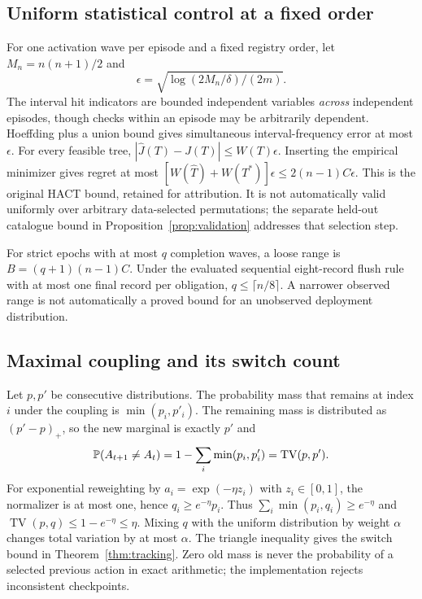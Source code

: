 \subsection{Uniform statistical control at a fixed order}
For one activation wave per episode and a fixed registry order, let $M_n=n(n+1)/2$ and
\[
 \epsilon=\sqrt{\log(2M_n/\delta)/(2m)}.
\]
The interval hit indicators are bounded independent variables \emph{across} independent episodes, though checks within an episode may be arbitrarily dependent. Hoeffding plus a union bound gives simultaneous interval-frequency error at most $\epsilon$. For every feasible tree, $|\widehat J(T)-J(T)|\le W(T)\epsilon$. Inserting the empirical minimizer gives regret at most $[W(\widehat T)+W(T^*)]\epsilon\le2(n-1)C\epsilon$. This is the original HACT bound, retained for attribution. It is not automatically valid uniformly over arbitrary data-selected permutations; the separate held-out catalogue bound in Proposition~\ref{prop:validation} addresses that selection step.

For strict epochs with at most $q$ completion waves, a loose range is $B=(q+1)(n-1)C$. Under the evaluated sequential eight-record flush rule with at most one final record per obligation, $q\le\lceil n/8\rceil$. A narrower observed range is not automatically a proved bound for an unobserved deployment distribution.

\subsection{Maximal coupling and its switch count}
Let $p,p'$ be consecutive distributions. The probability mass that remains at index $i$ under the coupling is $\min(p_i,p'_i)$. The remaining mass is distributed as $(p'-p)_+$, so the new marginal is exactly $p'$ and
\[
 \mathbb P(A_{t+1}\ne A_t)=1-\sum_i\min(p_i,p'_i)=\operatorname{TV}(p,p').
\]
For exponential reweighting by $a_i=\exp(-\eta z_i)$ with $z_i\in[0,1]$, the normalizer is at most one, hence $q_i\ge e^{-\eta}p_i$. Thus $\sum_i\min(p_i,q_i)\ge e^{-\eta}$ and $\operatorname{TV}(p,q)\le1-e^{-\eta}\le\eta$. Mixing $q$ with the uniform distribution by weight $\alpha$ changes total variation by at most $\alpha$. The triangle inequality gives the switch bound in Theorem~\ref{thm:tracking}. Zero old mass is never the probability of a selected previous action in exact arithmetic; the implementation rejects inconsistent checkpoints.


